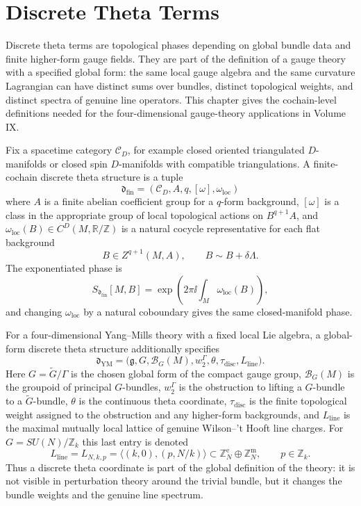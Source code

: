 \chapter{Discrete Theta Terms}
\label{ch:global-discrete-theta-terms}

\ConventionsEuclidean

Discrete theta terms are topological phases depending on global bundle data
and finite higher-form gauge fields.  They are part of the definition of a
gauge theory with a specified global form: the same local gauge algebra and
the same curvature Lagrangian can have distinct sums over bundles, distinct
topological weights, and distinct spectra of genuine line operators.  This
chapter gives the cochain-level definitions needed for the four-dimensional
gauge-theory applications in Volume IX.

\begin{definition}
\label{def:discrete-theta-datum}
Fix a spacetime category \(\mathcal C_D\), for example closed oriented
triangulated \(D\)-manifolds or closed spin \(D\)-manifolds with compatible
triangulations.  A finite-cochain discrete theta structure is a tuple
\[
  \mathfrak d_{\mathrm{fin}}
  =
  (\mathcal C_D,A,q,[\omega],\omega_{\mathrm{loc}})
\]
where \(A\) is a finite abelian coefficient group for a \(q\)-form
background, \([\omega]\) is a class in the appropriate group of local
topological actions on \(B^{q+1}A\), and
\(\omega_{\mathrm{loc}}(B)\in C^D(M,\mathbb R/\mathbb Z)\) is a natural
cocycle representative for each flat background
\[
  B\in Z^{q+1}(M,A),\qquad B\sim B+\delta\Lambda .
\]
The exponentiated phase is
\[
  S_{\mathfrak d_{\mathrm{fin}}}[M,B]
  =
  \exp\left(2\pi\ii\int_M\omega_{\mathrm{loc}}(B)\right),
\]
and changing \(\omega_{\mathrm{loc}}\) by a natural coboundary gives the same
closed-manifold phase.

For a four-dimensional Yang--Mills theory with a fixed local Lie algebra,
a global-form discrete theta structure additionally specifies
\[
  \mathfrak d_{\mathrm{YM}}
  =
  \bigl(
    \mathfrak g,G,\mathcal B_G(M),w_2^\Gamma,
    \theta,\tau_{\mathrm{disc}},L_{\mathrm{line}}
  \bigr).
\]
Here \(G=\widetilde G/\Gamma\) is the chosen global form of the compact gauge
group, \(\mathcal B_G(M)\) is the groupoid of principal \(G\)-bundles,
\(w_2^\Gamma\) is the obstruction to lifting a \(G\)-bundle to a
\(\widetilde G\)-bundle, \(\theta\) is the continuous theta coordinate,
\(\tau_{\mathrm{disc}}\) is the finite topological weight assigned to the
obstruction and any higher-form backgrounds, and \(L_{\mathrm{line}}\) is the
maximal mutually local lattice of genuine Wilson--'t Hooft line charges.
For \(G=SU(N)/\mathbb Z_k\) this last entry is denoted
\[
  L_{\mathrm{line}}=L_{N,k,p}
  =
  \langle (k,0),(p,N/k)\rangle
  \subset \mathbb Z_N^{\mathrm e}\oplus\mathbb Z_N^{\mathrm m},
  \qquad p\in\mathbb Z_k .
\]
Thus a discrete theta coordinate is part of the global definition of the
theory: it is not visible in perturbation theory around the trivial bundle,
but it changes the bundle weights and the genuine line spectrum.
\end{definition}

